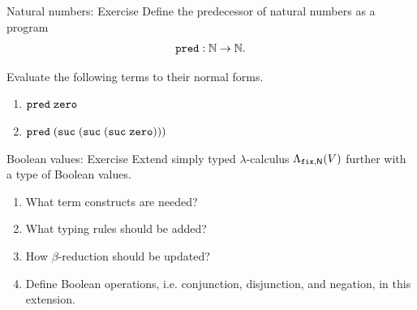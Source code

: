 \begin{frame}{Natural numbers: Exercise}
  Define the predecessor of natural numbers as a program
  \[
    \mathtt{pred} : \mathbb{N} \to \mathbb{N}.
  \]

  Evaluate the following terms to their normal forms.
  \begin{enumerate}
    \item $\mathtt{pred}\;\mathtt{zero}$
    \item $\mathtt{pred}\;(\mathtt{suc}\;(\mathtt{suc}\;(\mathtt{suc}\;\mathtt{zero})))$
  \end{enumerate}
\end{frame}

\begin{frame}{Boolean values: Exercise}
  Extend simply typed $\lambda$-calculus $\Lambda_{\mathtt{fix}, \mathsf{N}}(V)$ further with a type of Boolean values. 
  \begin{enumerate}
    \item What term constructs are needed?
    \item What typing rules should be added?
    \item How $\beta$-reduction should be updated?
    \item Define Boolean operations, i.e. conjunction, disjunction, and negation, in this extension.
  \end{enumerate}

\end{frame}
